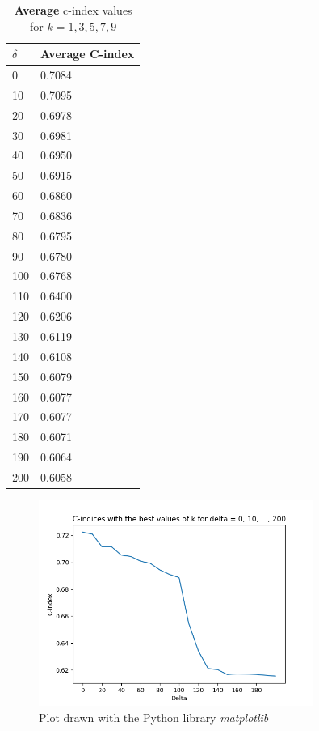 \documentclass[a4paper]{article}
\begin{document}
\begin{table}[htp]
\begin{center}
\begin{tabular}{l|l}
$\delta$ & Average C-index  \\\hline
0&0.7084\\
10&0.7095\\
20&0.6978\\
30&0.6981\\
40&0.6950\\
50&0.6915\\
60&0.6860\\
70&0.6836\\
80&0.6795\\
90&0.6780\\
100&0.6768\\
110&0.6400\\
120&0.6206\\
130&0.6119\\
140&0.6108\\
150&0.6079\\
160&0.6077\\
170&0.6077\\
180&0.6071\\
190&0.6064\\
200&0.6058\\
\end{tabular}
\caption{\textbf{Average} c-index values for $k = 1,3,5,7,9$}
\end{center}
\end{table}



\begin{figure}
\begin{center}
\includegraphics[width=0.8\textwidth]{c_idx_plot.png}
\caption{Plot drawn with the Python library \emph{matplotlib}}
\end{center}
\end{figure}
\end{document}
